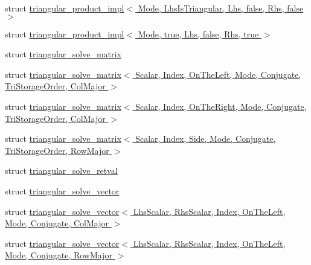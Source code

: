 \begin{DoxyCompactItemize}
\item 
struct \hyperlink{struct_eigen_1_1internal_1_1triangular__product__impl_3_01_mode_00_01_lhs_is_triangular_00_01_lh44afb66a9d3654cd1beb7f851ecab864}{triangular\+\_\+product\+\_\+impl$<$ Mode, Lhs\+Is\+Triangular, Lhs, false, Rhs, false $>$}
\item 
struct \hyperlink{struct_eigen_1_1internal_1_1triangular__product__impl_3_01_mode_00_01true_00_01_lhs_00_01false_00_01_rhs_00_01true_01_4}{triangular\+\_\+product\+\_\+impl$<$ Mode, true, Lhs, false, Rhs, true $>$}
\item 
struct \hyperlink{struct_eigen_1_1internal_1_1triangular__solve__matrix}{triangular\+\_\+solve\+\_\+matrix}
\item 
struct \hyperlink{struct_eigen_1_1internal_1_1triangular__solve__matrix_3_01_scalar_00_01_index_00_01_on_the_left_42f4ce9e44870d1944d8e65e6eb169ab}{triangular\+\_\+solve\+\_\+matrix$<$ Scalar, Index, On\+The\+Left, Mode, Conjugate, Tri\+Storage\+Order, Col\+Major $>$}
\item 
struct \hyperlink{struct_eigen_1_1internal_1_1triangular__solve__matrix_3_01_scalar_00_01_index_00_01_on_the_rightf2d31df4e035b9aff2381cc0bac19b97}{triangular\+\_\+solve\+\_\+matrix$<$ Scalar, Index, On\+The\+Right, Mode, Conjugate, Tri\+Storage\+Order, Col\+Major $>$}
\item 
struct \hyperlink{struct_eigen_1_1internal_1_1triangular__solve__matrix_3_01_scalar_00_01_index_00_01_side_00_01_m9c5e3cf61677ffd5b871aafbe3527bae}{triangular\+\_\+solve\+\_\+matrix$<$ Scalar, Index, Side, Mode, Conjugate, Tri\+Storage\+Order, Row\+Major $>$}
\item 
struct \hyperlink{struct_eigen_1_1internal_1_1triangular__solve__retval}{triangular\+\_\+solve\+\_\+retval}
\item 
struct \hyperlink{struct_eigen_1_1internal_1_1triangular__solve__vector}{triangular\+\_\+solve\+\_\+vector}
\item 
struct \hyperlink{struct_eigen_1_1internal_1_1triangular__solve__vector_3_01_lhs_scalar_00_01_rhs_scalar_00_01_ind063e019bb54cf6ae298090bc534a9cdf}{triangular\+\_\+solve\+\_\+vector$<$ Lhs\+Scalar, Rhs\+Scalar, Index, On\+The\+Left, Mode, Conjugate, Col\+Major $>$}
\item 
struct \hyperlink{struct_eigen_1_1internal_1_1triangular__solve__vector_3_01_lhs_scalar_00_01_rhs_scalar_00_01_ind05791747bf7342daa3286389f182e45b}{triangular\+\_\+solve\+\_\+vector$<$ Lhs\+Scalar, Rhs\+Scalar, Index, On\+The\+Left, Mode, Conjugate, Row\+Major $>$}
\item 

\end{DoxyCompactItemize}
